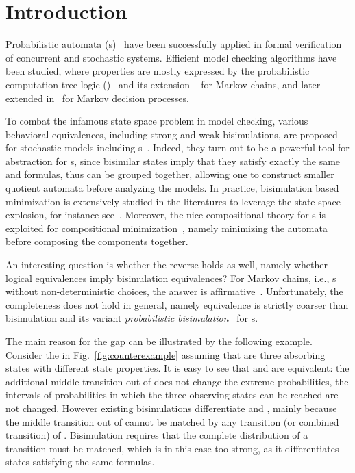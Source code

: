 \documentclass{LMCS}
\begin{document}
\section{Introduction}
Probabilistic automata (s)~\cite{SegalaL95} have been
successfully applied in formal verification of concurrent and
stochastic systems. Efficient model checking algorithms have been
studied, where properties are mostly expressed by the probabilistic
computation tree logic ()~\cite{hansson1994logic} and its
extension ~\cite{Aziz1995UWT} for Markov chains, and later
extended in~\cite{bianco1995model} for Markov decision processes.


To combat the infamous state space problem in model checking, various
behavioral equivalences, including strong and weak bisimulations, are
proposed for stochastic models including
s~\cite{LarsenS89,larsen1991bisimulation,Segala-thesis,baier2003comparative,SegalaL95}. Indeed,
they turn out to be a powerful tool for abstraction for s, since
bisimilar states imply that they satisfy exactly the same  and
 formulas, thus can be grouped together,
allowing one to construct smaller quotient automata before analyzing
the models.  In practice, bisimulation based minimization is
extensively studied in the literatures to leverage the state space
explosion, for instance see~\cite{CattaniS02,BaierEM00,KatoenKZJ07}.
Moreover, the nice compositional theory for s is exploited for
compositional minimization~\cite{BoudaliCS09}, namely minimizing the
automata before composing the components together.


An interesting question is whether the reverse holds as well, namely whether logical equivalences imply bisimulation equivalences?
For Markov chains, i.e.,
s without non-deterministic choices, the answer is affirmative~\cite{Aziz1995UWT,BaierKHW05}.
Unfortunately, the completeness does not hold in general, namely 
equivalence is strictly coarser than bisimulation and its variant
\emph{probabilistic bisimulation}~\cite{SegalaL95} for s.

The main reason for the gap can be illustrated by the following
example. Consider the  in Fig.~\ref{fig:counterexample}
assuming that  are three absorbing states with different
state properties. It is easy to see that   and  are  equivalent:
the additional middle transition out of  does not change the extreme probabilities,
the intervals of probabilities in which the three observing states can be reached are not changed.
However existing bisimulations differentiate  and ,
mainly because the middle transition out of  cannot be matched by
any transition (or combined transition) of . Bisimulation requires
that the complete distribution of a transition must be matched, which is in this case too
strong, as it differentiates states satisfying the same 
formulas.
\end{document}
